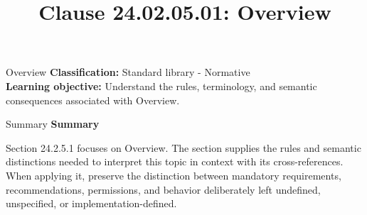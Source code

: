 \documentclass[10pt,letterpaper]{article}
\title{Clause 24.02.05.01: Overview}
\author{}
\date{}
\begin{document}
\maketitle
\begin{CornellOverviewBox}{Overview}
\textbf{Classification:} Standard library - Normative\\[2pt]
\textbf{Learning objective:} Understand the rules, terminology, and semantic consequences associated with Overview.
\end{CornellOverviewBox}\begin{CornellSummaryBox}{Summary}
{\sffamily\bfseries\color{Accent} Summary}\par\vspace{3pt}Section 24.2.5.1 focuses on Overview. The section supplies the rules and semantic distinctions needed to interpret this topic in context with its cross-references. When applying it, preserve the distinction between mandatory requirements, recommendations, permissions, and behavior deliberately left undefined, unspecified, or implementation-defined.
\end{CornellSummaryBox}
\end{document}
